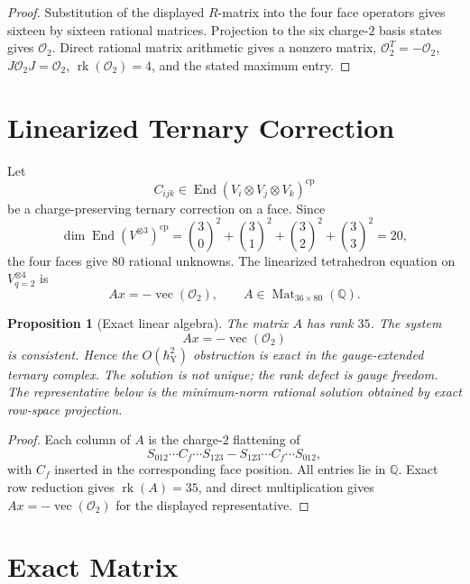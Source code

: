 \documentclass[11pt]{article}
\newtheorem{proposition}[theorem]{Proposition}
\theoremstyle{remark}
\providecommand{\Q}{\mathbb{Q}}
\providecommand{\End}{\operatorname{End}}
\providecommand{\rk}{\operatorname{rk}}
\providecommand{\hbarY}{\hbar_{\mathrm{Y}}}
\providecommand{\cO}{\mathcal{O}}
\begin{document}
\begin{proof}
Substitution of the displayed \(R\)-matrix into the four face
operators gives sixteen by sixteen rational matrices.  Projection to
the six charge-\(2\) basis states gives \(\cO_2\).  Direct rational
matrix arithmetic gives a nonzero matrix, \(\cO_2^T=-\cO_2\),
\(J\cO_2J=\cO_2\), \(\rk(\cO_2)=4\), and the stated maximum entry.
\end{proof}

\section{Linearized Ternary Correction}
\label{sec:linearized-correction}

Let
\[
 C_{ijk}\in \End(V_i\otimes V_j\otimes V_k)^{\mathrm{cp}}
\]
be a charge-preserving ternary correction on a face.  Since
\[
\dim\End(V^{\otimes3})^{\mathrm{cp}}
=\binom30^2+\binom31^2+\binom32^2+\binom33^2
=20,
\]
the four faces give \(80\) rational unknowns.  The linearized
tetrahedron equation on \(V^{\otimes4}_{q=2}\) is
\[
 A x=-\operatorname{vec}(\cO_2),
 \qquad A\in \operatorname{Mat}_{36\times80}(\Q).
\]

\begin{proposition}[Exact linear algebra]
\label{prop:exact-linear-algebra}
The matrix \(A\) has rank \(35\).  The system
\[
 A x=-\operatorname{vec}(\cO_2)
\]
is consistent.  Hence the \(O(\hbarY^2)\) obstruction is exact in the
gauge-extended ternary complex.  The solution is not unique; the
rank defect is gauge freedom.  The representative below is the
minimum-norm rational solution obtained by exact row-space projection.
\end{proposition}

\begin{proof}
Each column of \(A\) is the charge-\(2\) flattening of
\[
 S_{012}\cdots C_f\cdots S_{123}
 -
 S_{123}\cdots C_f\cdots S_{012},
\]
with \(C_f\) inserted in the corresponding face position.  All entries
lie in \(\Q\).  Exact row reduction gives \(\rk(A)=35\), and direct
multiplication gives \(A x=-\operatorname{vec}(\cO_2)\) for the
displayed representative.
\end{proof}

\section{Exact Matrix}
\label{sec:exact-matrix}
\end{document}
